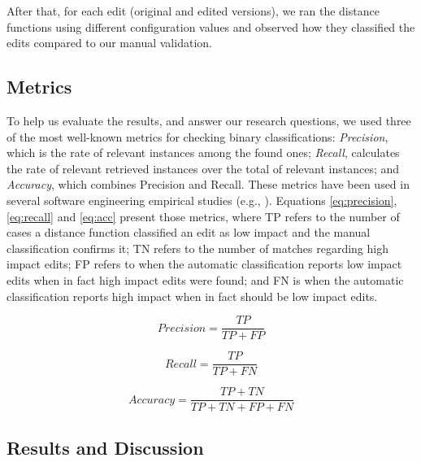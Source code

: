 After that, for each edit (original and edited versions), we ran the distance functions using different configuration values and observed how they classified the edits compared to our manual validation. 


\subsection{Metrics}

To help us evaluate the results, and answer our research questions, we used three of the most well-known metrics for checking binary classifications: \textit{Precision}, which is the rate of relevant instances among the found ones; \textit{Recall}, calculates the rate of relevant retrieved instances over the total of relevant instances; and \textit{Accuracy}, which combines Precision and Recall. These metrics have been used in several software engineering empirical studies (e.g., \citep{nagappan2008influence,hayes2005text, elish2008predicting}). Equations \ref{eq:precision}, \ref{eq:recall} and \ref{eq:acc} present those metrics, where TP refers to the number of cases a distance function classified an edit as low impact and the manual classification confirms it; TN refers to the number of matches regarding high impact edits; FP refers to when the automatic classification reports low impact edits when in fact high impact edits were found; and FN is when the automatic classification reports high impact when in fact should be low impact edits.   

\begin{equation} \label{eq:precision}
Precision = \frac{TP}{TP+FP}
\end{equation}

\begin{equation} \label{eq:recall}
Recall = \frac{TP}{TP+FN}
\end{equation}

\begin{equation} \label{eq:acc}
Accuracy = \frac{TP+TN}{TP+TN+FP+FN}
\end{equation}


\subsection{Results and Discussion} \label{sec:res}

